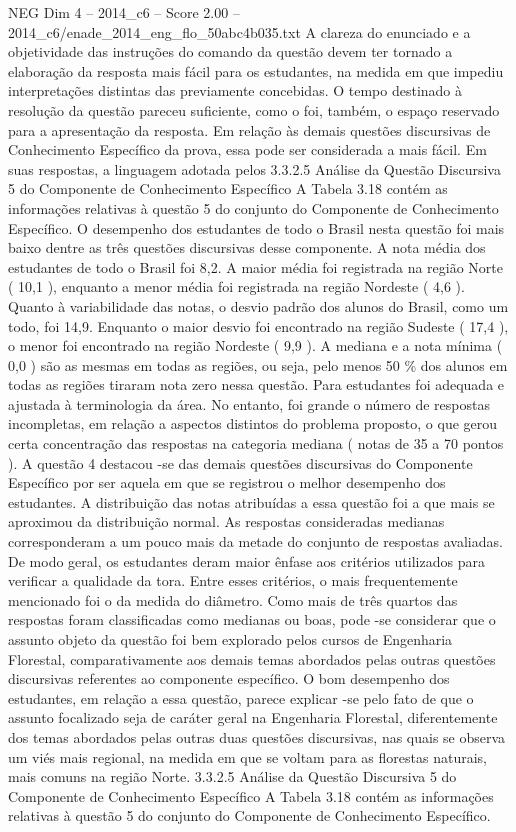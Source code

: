 \begin{textsample}{NEG Dim 4 – 2014\_c6 – Score 2.00 – 2014\_c6/enade\_2014\_eng\_flo\_50abc4b035.txt}
A clareza do enunciado e a objetividade das instruções do comando da questão devem ter tornado a elaboração da resposta mais fácil para os estudantes, na medida em que impediu interpretações distintas das previamente concebidas.
O tempo destinado à resolução da questão pareceu suficiente, como o foi, também, o espaço reservado para a apresentação da resposta.
Em relação às demais questões discursivas de Conhecimento Específico da prova, essa pode ser considerada a mais fácil.
Em suas respostas, a linguagem adotada pelos 3.3.2.5 Análise da Questão Discursiva 5 do Componente de Conhecimento Específico A Tabela 3.18 contém as informações relativas à questão 5 do conjunto do Componente de Conhecimento Específico.
O desempenho dos estudantes de todo o Brasil nesta questão foi mais baixo dentre as três questões discursivas desse componente.
A nota média dos estudantes de todo o Brasil foi 8,2.
A maior média foi registrada na região Norte ( 10,1 ), enquanto a menor média foi registrada na região Nordeste ( 4,6 ).
Quanto à variabilidade das notas, o desvio padrão dos alunos do Brasil, como um todo, foi 14,9.
Enquanto o maior desvio foi encontrado na região Sudeste ( 17,4 ), o menor foi encontrado na região Nordeste ( 9,9 ).
A mediana e a nota mínima ( 0,0 ) são as mesmas em todas as regiões, ou seja, pelo menos 50 \% dos alunos em todas as regiões tiraram nota zero nessa questão.
Para estudantes foi adequada e ajustada à terminologia da área.
No entanto, foi grande o número de respostas incompletas, em relação a aspectos distintos do problema proposto, o que gerou certa concentração das respostas na categoria mediana ( notas de 35 a 70 pontos ).
A questão 4 destacou -se das demais questões discursivas do Componente Específico por ser aquela em que se registrou o melhor desempenho dos estudantes.
A distribuição das notas atribuídas a essa questão foi a que mais se aproximou da distribuição normal.
As respostas consideradas medianas corresponderam a um pouco mais da metade do conjunto de respostas avaliadas.
De modo geral, os estudantes deram maior ênfase aos critérios utilizados para verificar a qualidade da tora.
Entre esses critérios, o mais frequentemente mencionado foi o da medida do diâmetro.
Como mais de três quartos das respostas foram classificadas como medianas ou boas, pode -se considerar que o assunto objeto da questão foi bem explorado pelos cursos de Engenharia Florestal, comparativamente aos demais temas abordados pelas outras questões discursivas referentes ao componente específico.
O bom desempenho dos estudantes, em relação a essa questão, parece explicar -se pelo fato de que o assunto focalizado seja de caráter geral na Engenharia Florestal, diferentemente dos temas abordados pelas outras duas questões discursivas, nas quais se observa um viés mais regional, na medida em que se voltam para as florestas naturais, mais comuns na região Norte. 3.3.2.5 Análise da Questão Discursiva 5 do Componente de Conhecimento Específico A Tabela 3.18 contém as informações relativas à questão 5 do conjunto do Componente de Conhecimento Específico.

\end{textsample}
